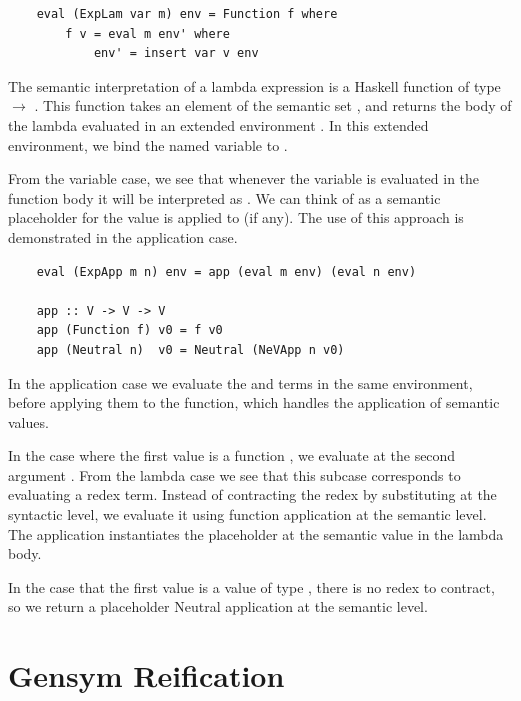 \begin{lstlisting}
    eval (ExpLam var m) env = Function f where
        f v = eval m env' where
            env' = insert var v env
\end{lstlisting}

The semantic interpretation of a lambda expression is a Haskell function of type  $\rightarrow$ . This function takes an element  of the semantic set , and returns the body of the lambda evaluated in an extended environment . In this extended environment, we bind the named variable  to .

From the variable case, we see that whenever the variable  is evaluated in the function body it will be interpreted as . We can think of  as a semantic placeholder for the value  is applied to (if any). The use of this approach is demonstrated in the application case.

\begin{lstlisting}
    eval (ExpApp m n) env = app (eval m env) (eval n env)

    app :: V -> V -> V
    app (Function f) v0 = f v0
    app (Neutral n)  v0 = Neutral (NeVApp n v0)
\end{lstlisting}

In the application case we evaluate the  and  terms in the same environment, before applying them to the  function, which handles the application of semantic values. 

In the case where the first value is a function , we evaluate  at the second argument . From the lambda case we see that this subcase corresponds to evaluating a redex term. Instead of contracting the redex by substituting at the syntactic level, we evaluate it using function application at the semantic level. The application instantiates the placeholder  at the semantic value  in the lambda body. 

In the case that the first value is a value  of type , there is no redex to contract, so we return a placeholder Neutral application at the semantic level.

\section{Gensym Reification}

